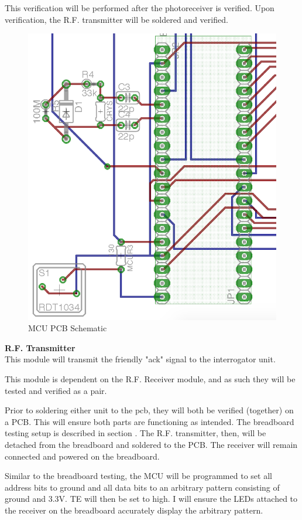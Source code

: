 \documentclass[letterpaper,10pt]{article}
\begin{document}
\begin{spacing}{1.15}
This verification will be performed after the photoreceiver is verified. Upon verification, the R.F. transmitter will be soldered and verified. 
\begin{figure} [H]
	\centering
	\includegraphics[scale=.7]{mcu-pcb.png}
	\caption{MCU PCB Schematic\label{fig:mcu-pcb}}
\end{figure}

\normalsize\textbf{R.F. Transmitter} \\
This module will transmit the friendly "ack" signal to the interrogator unit. 

This module is dependent on the R.F. Receiver module, and as such they will be tested and verified as a pair. 

Prior to soldering either unit to the pcb, they will both be verified (together) on a PCB. This will ensure both parts are functioning as intended. The breadboard testing setup is described in section \label{section:radio-breadboard}. The R.F. transmitter, then, will be detached from the breadboard and soldered to the PCB. The receiver will remain connected and powered on the breadboard.

Similar to the breadboard testing, the MCU will be programmed to set all address bits to ground and all data bits to an arbitrary pattern consisting of ground and 3.3V. TE will then be set to high. I will ensure the LEDs attached to the receiver on the breadboard accurately display the arbitrary pattern. 


\end{spacing}
\end{document}
